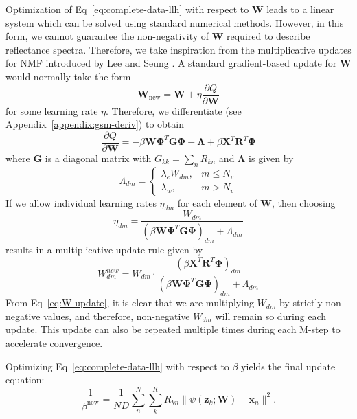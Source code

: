 Optimization of Eq~\ref{eq:complete-data-llh} with respect to $\mathbf{W}$ leads
to a linear system which can be solved using standard numerical methods.
However, in this form, we cannot guarantee the non-negativity of $\mathbf{W}$
required to describe reflectance spectra. Therefore, we take inspiration from
the multiplicative updates for NMF introduced by Lee and Seung \cite{nmf-orig}.
A standard gradient-based update for $\mathbf{W}$ would normally take the form
\begin{equation}
    \mathbf{W}_{\text{new}} = \mathbf{W} + \eta\frac{\partial Q}{\partial \mathbf{W}}
\end{equation}
for some learning rate $\eta$. Therefore, we differentiate (see
Appendix~\ref{appendix:gsm-deriv}) to obtain
\begin{equation}
    \frac{\partial Q}{\partial \mathbf{W}} = -\beta \mathbf{W}\mathbf{\Phi}^T\mathbf{G}\mathbf{\Phi} - \mathbf{\Lambda} + \beta \mathbf{X}^T\mathbf{R}^T\mathbf{\Phi}
\end{equation}
where $\mathbf{G}$ is a diagonal matrix with $G_{kk} = \sum_n R_{kn}$ and
$\mathbf{\Lambda}$ is given by
\begin{equation}
    \Lambda_{dm} = \begin{cases}
        \lambda_e W_{dm}, & m \leq N_v \\
        \lambda_w, & m > N_v
    \end{cases}
\end{equation}
If we allow individual learning rates $\eta_{dm}$ for each element of
$\mathbf{W}$, then choosing
\begin{equation}
    \eta_{dm} = \frac{W_{dm}}{\left(\beta \mathbf{W}\mathbf{\Phi}^T\mathbf{G}\mathbf{\Phi}\right)_{dm} + \Lambda_{dm}}
\end{equation}
results in a multiplicative update rule given by
\begin{equation}\label{eq:W-update}
    W_{dm}^{new}  = W_{dm} \cdot \dfrac{\left(\beta \mathbf{X}^T\mathbf{R}^T\mathbf{\Phi}\right)_{dm}}{\left(\beta \mathbf{W}\mathbf{\Phi}^T\mathbf{G}\mathbf{\Phi}\right)_{dm} + \Lambda_{dm}}
\end{equation}
From Eq~\ref{eq:W-update}, it is clear that we are multiplying $W_{dm}$ by
strictly non-negative values, and therefore, non-negative $W_{dm}$ will remain
so during each update. This update can also be repeated multiple times during
each M-step to accelerate convergence.

Optimizing Eq~\ref{eq:complete-data-llh} with respect to $\beta$ yields the final update equation:
\begin{equation}\label{eq:beta-update}
    \frac{1}{\beta^{\text{new}}}  = \frac{1}{ND}\sum\limits_n^N\sum\limits_k^K R_{kn}\lVert \psi(\mathbf{z}_k; \mathbf{W}) - \mathbf{x}_n \rVert^2.
\end{equation}


